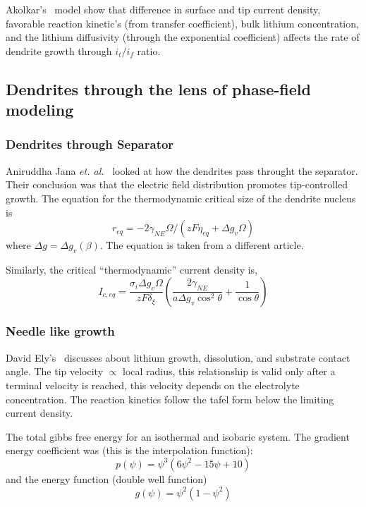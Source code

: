 \documentclass[12pt]{book}
\begin{document}
Akolkar's~\cite{Akolkar2013} model show that difference in surface and tip current density, favorable reaction kinetic's (from transfer coefficient), bulk lithium concentration, and the lithium diffusivity (through the exponential coefficient) affects the rate of dendrite growth through $i_{t}/i_{f}$ ratio.

\subsection{Dendrites through the lens of phase-field modeling}
\subsubsection{Dendrites through Separator}
Aniruddha Jana \textit{et. al.}~\cite{Jana2015} looked at how the dendrites pass throught the separator. Their conclusion was that the electric field distribution promotes tip-controlled growth. The equation for the thermodynamic critical size of the dendrite nucleus is
\begin{equation}
r_{eq} = -2\gamma_{NE}\Omega/\left(zF\eta_{eq}+\Delta g_{v}\Omega\right)
\end{equation}
where $\Delta g = \Delta g_{v} \left(\beta\right)$. The equation is taken from a different article.

Similarly, the critical ``thermodynamic'' current density is,
\begin{equation}
I_{c,eq}=\frac{\sigma_{i}\Delta g_{v}\Omega}{zF\delta_{\xi}}\left(\frac{2\gamma_{NE}}{a\Delta g_{v}\cos^{2}\theta}+\frac{1}{\cos\theta}\right)
\end{equation}
\subsubsection{Needle like growth}
David Ely's~\cite{Ely2014} discusses about lithium growth, dissolution, and substrate contact angle. The tip velocity $\propto$ local radius, this relationship is valid only after a terminal velocity is reached, this velocity depends on the electrolyte concentration. The reaction kinetics follow the tafel form below the limiting current density.

The total gibbs free energy for an isothermal and isobaric system. The gradient energy coefficient was (this is the interpolation function): 
\begin{equation}
p\left(\psi\right) = \psi^3 \left(6\psi^2 - 15\psi+10\right)
\end{equation}
and the energy function (double well function)
\begin{equation}
g\left(\psi\right) = \psi^2\left(1-\psi^2\right)
\end{equation}
\end{document}
